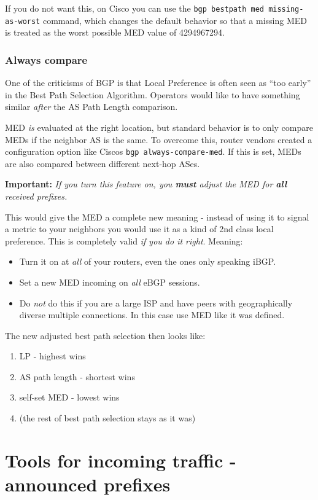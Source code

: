 If you do not want this, on Cisco you can use the \verb+bgp bestpath med missing-as-worst+ command, which changes the default behavior so that a missing MED is treated as the worst possible MED value of 4294967294.


\subsubsection{Always compare}
One of the criticisms  of BGP is that Local Preference is often seen as ``too early'' in the Best Path Selection Algorithm. Operators would like to have something similar \emph{after} the AS Path Length comparison.

 MED \emph{is} evaluated at the right location, but standard behavior is to only compare MEDs if the neighbor AS is the same. To overcome this, router vendors created a configuration option like Ciscos \verb+bgp always-compare-med+. If this is set, MEDs are also compared between different next-hop ASes.

\textbf{Important:} \emph{If you turn this feature on, you \textbf{must} adjust the MED for \textbf{all} received prefixes.}

This would give the MED a complete new meaning - instead of using it to signal  a metric to your neighbors you would use it as a kind of 2nd class local preference. This is completely valid \emph{if you do it right}. Meaning:
\begin{itemize}
  \item Turn it on at \emph{all} of your routers, even the ones only speaking iBGP.
  \item Set a new MED incoming on \emph{all} eBGP sessions.
  \item Do \emph{not} do this if you are a large ISP and have peers with geographically diverse multiple connections. In this case use MED like it was defined.
\end{itemize}

The new adjusted best path selection then looks like:
\begin{enumerate}
  \item \Gls{LP} - highest wins
  \item AS path length - shortest wins
  \item self-set MED - lowest wins
  \item (the rest of best path selection stays as it was)
\end{enumerate}


\section{Tools for incoming traffic - announced prefixes}
